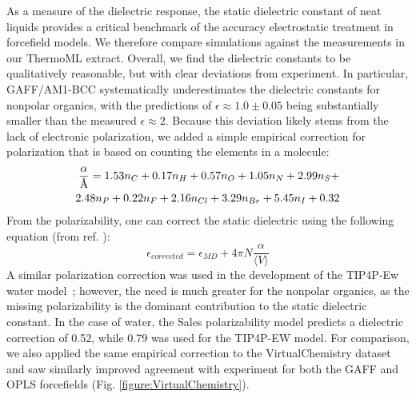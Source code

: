 \documentclass[aps,pre,twocolumn,nofootinbib,superscriptaddress,linenumbers]{revtex4-1}
\begin{document}
As a measure of the dielectric response, the static dielectric constant of neat liquids provides a critical benchmark of the accuracy electrostatic treatment in forcefield models.  
We therefore compare simulations against the measurements in our ThermoML extract.  
Overall, we find the dielectric constants to be qualitatively reasonable, but with clear deviations from experiment.  
In particular, GAFF/AM1-BCC systematically underestimates the dielectric constants for nonpolar organics, with the predictions of $\epsilon \approx 1.0 \pm 0.05$ being substantially smaller than the measured $\epsilon \approx 2$.  
Because this deviation likely stems from the lack of electronic polarization, we added a simple empirical correction for polarization \cite{bosque2002polarizabilities} that is based on counting the elements in a molecule:
\begin{equation} \label{eq:sales}
\begin{split}
\frac{\alpha}{\textnormal{\AA}} = 1.53 n_C + 0.17 n_H + 0.57 n_O + 1.05 n_N + 2.99 n_S + \\ 2.48 n_P + 0.22 n_F + 2.16 n_{Cl} + 3.29 n_{Br} + 5.45 n_I + 0.32 
\end{split}
\end{equation}
From the polarizability, one can correct the static dielectric using the following equation (from ref. \cite{horn2004}):
$$\epsilon_{corrected} = \epsilon_{MD} + 4 \pi N  \frac{\alpha}{\langle V \rangle}$$
A similar polarization correction was used in the development of the TIP4P-Ew water model~\cite{horn2004}; however, the need is much greater for the nonpolar organics, as the missing polarizability is the dominant contribution to the static dielectric constant.  
In the case of water, the Sales polarizability model predicts a dielectric correction of 0.52, while 0.79 was used for the TIP4P-EW model.  
For comparison, we also applied the same empirical correction to the VirtualChemistry dataset~\cite{caleman2011force, van2012gromacs} and saw similarly improved agreement with experiment for both the GAFF and OPLS forcefields (Fig. \ref{figure:VirtualChemistry}).

\end{document}
